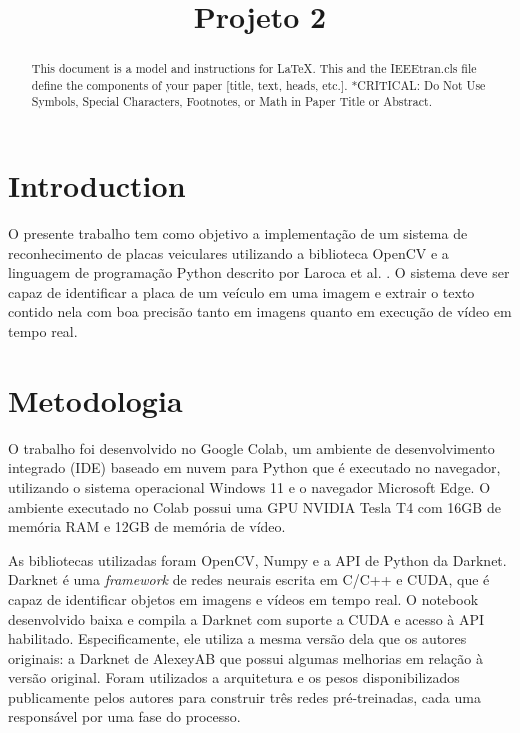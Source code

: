 \documentclass[conference]{IEEEtran}
\begin{document}
\title{Projeto 2}

\author{
}

\maketitle

\begin{abstract}
This document is a model and instructions for \LaTeX.
This and the IEEEtran.cls file define the components of your paper [title, text, heads, etc.]. *CRITICAL: Do Not Use Symbols, Special Characters, Footnotes, 
or Math in Paper Title or Abstract.
\end{abstract}

\section{Introduction}
\label{sec:introducao}
O presente trabalho tem como objetivo a implementação de um sistema de reconhecimento de placas veiculares utilizando a biblioteca OpenCV e a linguagem de programação Python descrito por Laroca et al. \cite{b1}.
O sistema deve ser capaz de identificar a placa de um veículo em uma imagem e extrair o texto contido nela com boa precisão tanto em imagens quanto em execução de vídeo em tempo real.

\section{Metodologia}
\label{sec:metodologia}
O trabalho foi desenvolvido no Google Colab, um ambiente de desenvolvimento integrado (IDE) baseado em nuvem para Python que é executado no navegador, utilizando o sistema operacional Windows 11 e o navegador Microsoft Edge.
O ambiente executado no Colab possui uma GPU NVIDIA Tesla T4 com 16GB de memória RAM e 12GB de memória de vídeo.

As bibliotecas utilizadas foram OpenCV, Numpy e a API de Python da Darknet.
Darknet é uma \textit{framework} de redes neurais escrita em C/C++ e CUDA, que é capaz de identificar objetos em imagens e vídeos em tempo real.
O notebook desenvolvido baixa e compila a Darknet com suporte a CUDA e acesso à API habilitado.
Especificamente, ele utiliza a mesma versão dela que os autores originais: a Darknet de AlexeyAB \cite{b3} que possui algumas melhorias em relação à versão original.
Foram utilizados a arquitetura e os pesos disponibilizados publicamente pelos autores\cite{b2} para construir três redes pré-treinadas, cada uma responsável por uma fase do processo.
\end{document}
